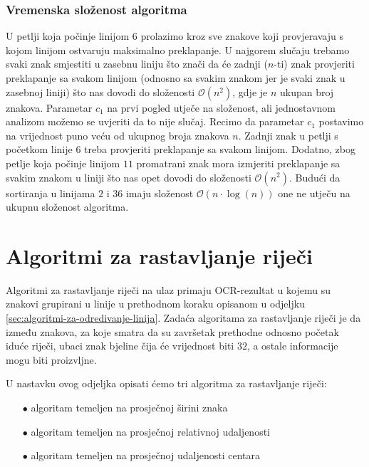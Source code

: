 \documentclass[times, utf8, zavrsni]{fer}
\begin{document}
\subsubsection{Vremenska složenost algoritma}
U petlji koja počinje linijom $6$ prolazimo kroz sve znakove koji provjeravaju
s kojom linijom ostvaruju maksimalno preklapanje. U najgorem slučaju trebamo
svaki znak smjestiti u zasebnu liniju što znači da će zadnji ($n$-ti) znak provjeriti preklapanje sa svakom linijom (odnosno sa svakim znakom jer je svaki znak u zasebnoj liniji) što nas dovodi do složenosti
$\mathcal{O}(n^2)$, gdje je $n$ ukupan broj znakova. Parametar $c_1$ na prvi
pogled utječe na složenost, ali jednostavnom analizom možemo se uvjeriti da to
nije slučaj. Recimo da parametar $c_1$ postavimo na vrijednost
puno veću od ukupnog broja znakova $n$. Zadnji znak u petlji s početkom
linije $6$ treba provjeriti preklapanje sa svakom linijom. Dodatno, zbog petlje
koja počinje linijom $11$ promatrani znak mora izmjeriti preklapanje sa svakim
znakom u liniji što nas opet dovodi do složenosti $\mathcal{O}(n^2)$.
Budući da sortiranja u linijama $2$ i $36$ imaju složenost
$\mathcal{O}(n \cdot \log(n))$ one ne utječu na ukupnu složenost algoritma.








\section{Algoritmi za rastavljanje riječi}
Algoritmi za rastavljanje riječi na ulaz primaju OCR-rezultat u kojemu su
znakovi grupirani u linije u prethodnom koraku opisanom u odjeljku
\ref{sec:algoritmi-za-odredivanje-linija}. Zadaća algoritama za rastavljanje
riječi je da između znakova, za koje smatra da su završetak prethodne odnosno
početak iduće riječi, ubaci znak bjeline čija će vrijednost  biti
$32$, a ostale informacije mogu biti proizvljne.

U nastavku ovog odjeljka opisati ćemo tri algoritma za rastavljanje riječi:
\begin{itemize}
    \item[$\bullet$] algoritam temeljen na prosječnoj širini znaka
    \item[$\bullet$] algoritam temeljen na prosječnoj relativnoj
                     udaljenosti
    \item[$\bullet$] algoritam temeljen na prosječnoj udaljenosti centara
\end{itemize}
\end{document}
